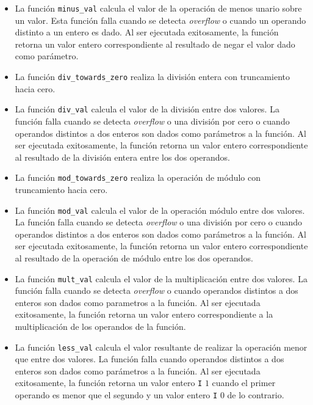 \begin{itemize}
\item{La función \verb|minus_val| calcula el valor de la operación de menos unario sobre un valor.
Esta función falla cuando se detecta \textit{overflow} o cuando un operando distinto a un entero es dado.
Al ser ejecutada exitosamente, la función retorna un valor entero correspondiente al resultado de negar el valor dado como parámetro.}

\item{La función \verb|div_towards_zero| realiza la división entera con truncamiento hacia cero.}

\item{La función \verb|div_val| calcula el valor de la división entre dos valores.
La función falla cuando se detecta \textit{overflow} o una división por cero o cuando operandos distintos a dos enteros son dados como parámetros a la función.
Al ser ejecutada exitosamente, la función retorna un valor entero correspondiente al resultado de la división entera entre los dos operandos.}

\item{La función \verb|mod_towards_zero| realiza la operación de módulo con truncamiento hacia cero.}

\item{La función \verb|mod_val| calcula el valor de la operación módulo entre dos valores.
La función falla cuando se detecta \textit{overflow} o una división por cero o cuando operandos distintos a dos enteros son dados como parámetros a la función.
Al ser ejecutada exitosamente, la función retorna un valor entero correspondiente al resultado de la operación de módulo entre los dos operandos.}

\item{La función \verb|mult_val| calcula el valor de la multiplicación entre dos valores.
La función falla cuando se detecta \textit{overflow} o cuando operandos distintos a dos enteros son dados como parametros a la función. 
Al ser ejecutada exitosamente, la función retorna un valor entero correspondiente a la multiplicación de los operandos de la función.}

\item{La función \verb|less_val| calcula el valor resultante de realizar la operación menor que entre dos valores.
La función falla cuando operandos distintos a dos enteros son dados como parámetros a la función.
Al ser ejecutada exitosamente, la función retorna un valor entero \verb|I| $1$ cuando el primer operando es menor que el segundo y un valor entero \verb|I| $0$ de lo contrario.}


\end{itemize}
